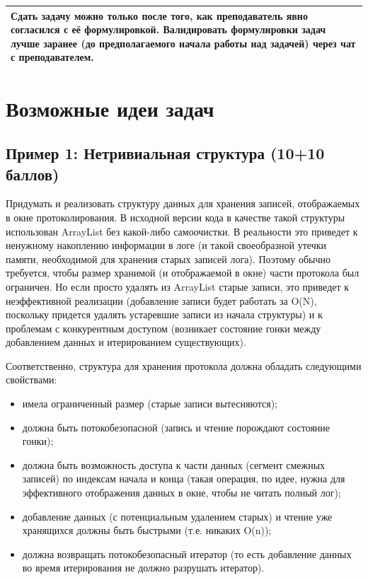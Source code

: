 \documentclass[a4paper,12pt]{article}
\begin{document}
\begin{center}
\begin{tabular}{|p{10cm}|}
    \hline
    Сдать задачу можно только после того, как преподаватель явно согласился с её формулировкой. Валидировать формулировки задач лучше заранее (до предполагаемого начала работы над задачей) через чат  с преподавателем. \\
    \hline
\end{tabular}
\end{center}


\section{Возможные идеи задач}

\subsection{Пример 1: Нетривиальная структура (10+10 баллов)}

Придумать и реализовать структуру данных для хранения записей, отображаемых в окне протоколирования. В исходной версии кода в качестве такой структуры использован ArrayList без какой-либо самоочистки. В реальности это приведет к ненужному накоплению информации в логе (и такой своеобразной утечки памяти, необходимой для хранения старых записей лога). Поэтому обычно требуется, чтобы размер хранимой (и отображаемой в окне) части протокола был ограничен. Но если просто удалять из ArrayList старые записи, это приведет к неэффективной реализации (добавление записи будет работать за O(N), поскольку придется удалять устаревшие записи из начала структуры) и к проблемам с конкурентным доступом (возникает состояние гонки между добавлением данных и итерированием существующих).

Соответственно, структура для хранения протокола должна обладать следующими свойствами:
\begin{itemize}
    \item имела ограниченный размер (старые записи вытесняются);
    \item должна быть потокобезопасной (запись и чтение порождают состояние гонки);
    \item должна быть возможность доступа к части данных (сегмент смежных записей) по индексам начала и конца (такая операция, по идее, нужна для эффективного отображения данных в окне, чтобы не читать полный лог);
    \item добавление данных (с потенциальным удалением старых) и чтение уже хранящихся должны быть быстрыми (т.е. никаких O(n));
    \item должна возвращать потокобезопасный итератор (то есть добавление данных во время итерирования не должно разрушать итератор).
\end{itemize}
\end{document}
